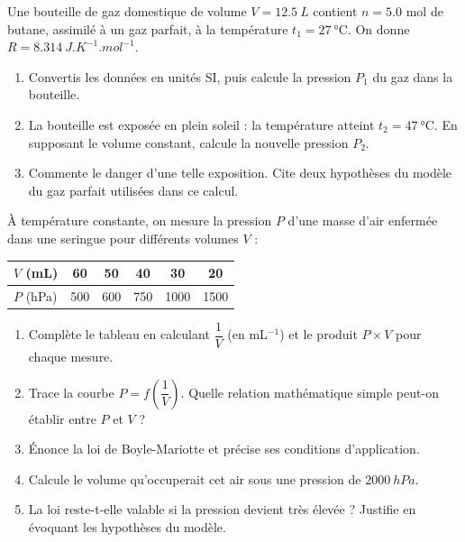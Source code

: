 \documentclass[11pt]{article}
\begin{document}
\begin{exercice}
Une bouteille de gaz domestique de volume $V = \SI{12,5}{L}$ contient $n = \num{5,0}$ mol de butane, assimilé à un gaz parfait, à la température $t_1 = \SI{27}{\celsius}$. On donne $R = \SI{8,314}{J.K^{-1}.mol^{-1}}$.
\begin{enumerate}
\item Convertis les données en unités SI, puis calcule la pression $P_1$ du gaz dans la bouteille.
\item La bouteille est exposée en plein soleil : la température atteint $t_2 = \SI{47}{\celsius}$. En supposant le volume constant, calcule la nouvelle pression $P_2$.
\item Commente le danger d'une telle exposition. Cite deux hypothèses du modèle du gaz parfait utilisées dans ce calcul.
\end{enumerate}
\end{exercice}

\begin{exercice}
À température constante, on mesure la pression $P$ d'une masse d'air enfermée dans une seringue pour différents volumes $V$ :
\begin{center}
\begin{tabular}{|l|*{5}{c|}}\hline
$V$ (mL) & 60 & 50 & 40 & 30 & 20 \\ \hline
$P$ (hPa) & 500 & 600 & 750 & 1000 & 1500 \\ \hline
\end{tabular}
\end{center}
\begin{enumerate}
\item Complète le tableau en calculant $\dfrac{1}{V}$ (en mL$^{-1}$) et le produit $P \times V$ pour chaque mesure.
\item Trace la courbe $P = f\left(\dfrac{1}{V}\right)$. Quelle relation mathématique simple peut-on établir entre $P$ et $V$ ?
\item Énonce la loi de Boyle-Mariotte et précise ses conditions d'application.
\item Calcule le volume qu'occuperait cet air sous une pression de $\SI{2000}{hPa}$.
\item La loi reste-t-elle valable si la pression devient très élevée ? Justifie en évoquant les hypothèses du modèle.
\end{enumerate}
\end{exercice}
\end{document}

